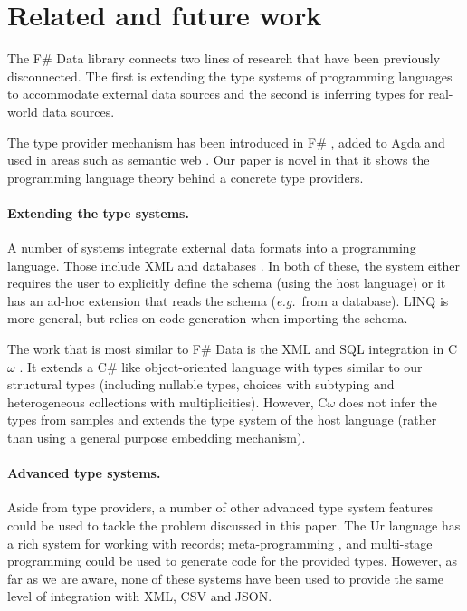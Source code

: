\documentclass[10pt,preprint,blind,clearpagebib]{sigplanconf}
\begin{document}
\section{Related and future work}
\label{sec:related}

The F\# Data library connects two lines of research that have been previously disconnected. The first is 
extending the type systems of programming languages to accommodate external data sources and the second
is inferring types for real-world data sources.

The type provider mechanism has been introduced in F\# \cite{fsharp-typeprov,fsharp-typeprov-ddfp}, 
added to Agda \cite{agda-tp} and used in areas such as semantic web \cite{liteq}. Our paper is novel 
in that it shows the programming language theory behind a concrete type providers. 

\paragraph{Extending the type systems.} 
A number of systems integrate external data formats into a programming language. Those include 
XML \cite{xduce,xduce-ml} and databases \cite{links}. In both of these, the system either requires
the user to explicitly define the schema (using the host language) or it has an ad-hoc extension 
that reads the schema (\emph{e.g.}~from a database). LINQ \cite{linq} is more general, but relies
on code generation when importing the schema.

The work that is most similar to F\# Data is the XML and SQL integration in C$\omega$ \cite{comega-xs}.
It extends a C\# like object-oriented language with types similar to our structural types 
(including nullable types, choices with subtyping and heterogeneous collections with multiplicities).
However, C$\omega$ does not infer the types from samples and extends the type system of the host
language (rather than using a general purpose embedding mechanism).

\paragraph{Advanced type systems.}
Aside from type providers, a number of other advanced type system features could be used to
tackle the problem discussed in this paper. The Ur \cite{ur} language has a rich system for working
with records; meta-programming \cite{template-hask}, \cite{th-camlp4} and multi-stage programming \cite{multi-stage}
could be used to generate code for the provided types. However, as far as we are aware, none of these 
systems have been used to provide the same level of integration with XML, CSV and JSON.
\end{document}
